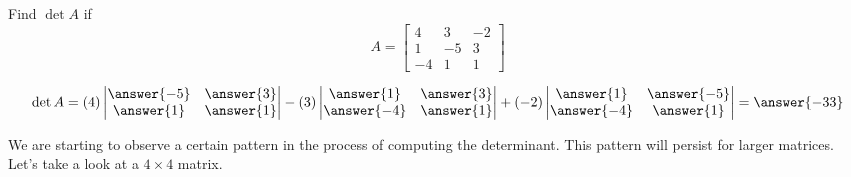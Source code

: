 \documentclass{ximera}
\begin{document}
\begin{example}\label{ex:3x3det2}
Find $\det{A}$ if 
$$A=\begin{bmatrix}4&3&-2\\1&-5&3\\-4&1&1\end{bmatrix}$$
\begin{explanation}
$$
\det{A}=(4)\begin{vmatrix}\answer{-5}&\answer{3}\\\answer{1}&\answer{1}\end{vmatrix}-(3)\begin{vmatrix}\answer{1}&\answer{3}\\\answer{-4}&\answer{1}\end{vmatrix}+(-2)\begin{vmatrix}\answer{1}&\answer{-5}\\\answer{-4}&\answer{1}\end{vmatrix}
=\answer{-33}
$$
\end{explanation}
\end{example}

We are starting to observe a certain pattern in the process of computing the determinant.  This pattern will persist for larger matrices.  Let's take a look at a $4\times 4$ matrix.
\end{document}
